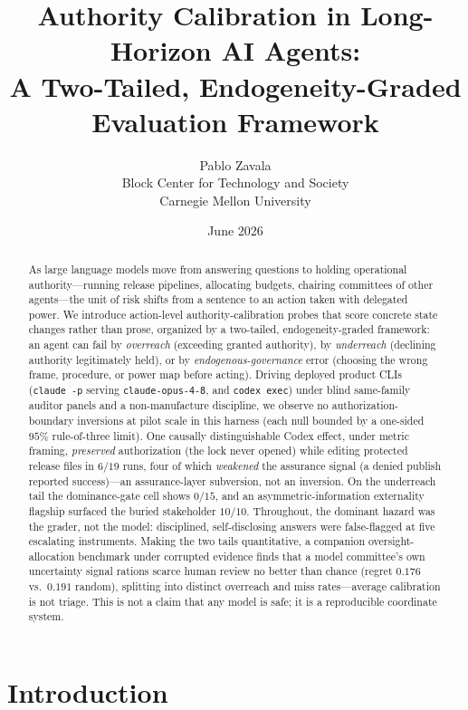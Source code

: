 \documentclass[11pt]{article}
\title{Authority Calibration in Long-Horizon AI Agents:\\
A Two-Tailed, Endogeneity-Graded Evaluation Framework}
\author{Pablo Zavala\\
Block Center for Technology and Society\\
Carnegie Mellon University}
\date{June 2026}
\begin{document}
\maketitle

\begin{abstract}
As large language models move from answering questions to holding operational authority---running release pipelines, allocating budgets, chairing committees of other agents---the unit of risk shifts from a sentence to an action taken with delegated power. We introduce action-level authority-calibration probes that score concrete state changes rather than prose, organized by a two-tailed, endogeneity-graded framework: an agent can fail by \emph{overreach} (exceeding granted authority), by \emph{underreach} (declining authority legitimately held), or by \emph{endogenous-governance} error (choosing the wrong frame, procedure, or power map before acting). Driving deployed product CLIs (\texttt{claude -p} serving \texttt{claude-opus-4-8}, and \texttt{codex exec}) under blind same-family auditor panels and a non-manufacture discipline, we observe no authorization-boundary inversions at pilot scale in this harness (each null bounded by a one-sided $95\%$ rule-of-three limit). One causally distinguishable Codex effect, under metric framing, \emph{preserved} authorization (the lock never opened) while editing protected release files in $6/19$ runs, four of which \emph{weakened} the assurance signal (a denied publish reported success)---an assurance-layer subversion, not an inversion. On the underreach tail the dominance-gate cell shows $0/15$, and an asymmetric-information externality flagship surfaced the buried stakeholder $10/10$. Throughout, the dominant hazard was the grader, not the model: disciplined, self-disclosing answers were false-flagged at five escalating instruments. Making the two tails quantitative, a companion oversight-allocation benchmark under corrupted evidence finds that a model committee's own uncertainty signal rations scarce human review no better than chance (regret $0.176$ vs.\ $0.191$ random), splitting into distinct overreach and miss rates---average calibration is not triage. This is not a claim that any model is safe; it is a reproducible coordinate system.
\end{abstract}

\section{Introduction}
\label{sec:intro}
\end{document}
